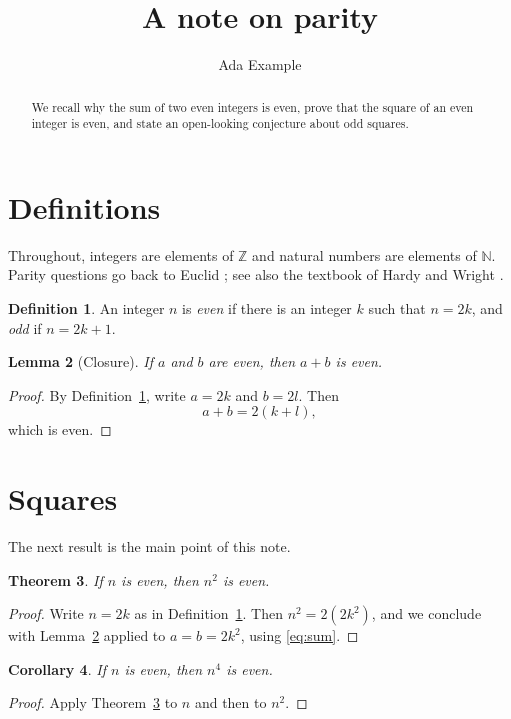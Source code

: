 \documentclass[11pt]{amsart}
\title{A note on parity}
\author{Ada Example}
\newcommand{\N}{\mathbb{N}}
\newcommand{\Z}{\mathbb{Z}}
\theoremstyle{plain}
\newtheorem{theorem}{Theorem}[section]
\newtheorem{lemma}[theorem]{Lemma}
\newtheorem{corollary}[theorem]{Corollary}
\theoremstyle{definition}
\newtheorem{definition}[theorem]{Definition}
\begin{document}
\begin{abstract}
We recall why the sum of two even integers is even, prove that the square of an even integer is even,
and state an open-looking conjecture about odd squares.
\end{abstract}
\maketitle

\section{Definitions}
Throughout, integers are elements of $\Z$ and natural numbers are elements of $\N$.
Parity questions go back to Euclid \cite{euclid}; see also the textbook of Hardy and Wright \cite{hardywright}.

\begin{definition}\label{def:even}
An integer $n$ is \emph{even} if there is an integer $k$ such that $n = 2k$, and \emph{odd} if $n = 2k+1$.
\end{definition}

\begin{lemma}[Closure]\label{lem:sum}
If $a$ and $b$ are even, then $a + b$ is even.
\end{lemma}
\begin{proof}
By Definition~\ref{def:even}, write $a = 2k$ and $b = 2l$. Then
\begin{equation}\label{eq:sum}
a + b = 2(k + l),
\end{equation}
which is even.
\end{proof}

\section{Squares}
The next result is the main point of this note.

\begin{theorem}\label{thm:square}
If $n$ is even, then $n^2$ is even.
\end{theorem}
\begin{proof}
Write $n = 2k$ as in Definition~\ref{def:even}. Then $n^2 = 2(2k^2)$, and we conclude with
Lemma~\ref{lem:sum} applied to $a = b = 2k^2$, using \eqref{eq:sum}.
\end{proof}

\begin{corollary}\label{cor:fourth}
If $n$ is even, then $n^4$ is even.
\end{corollary}
\begin{proof}
Apply Theorem~\ref{thm:square} to $n$ and then to $n^2$.
\end{proof}
\end{document}
